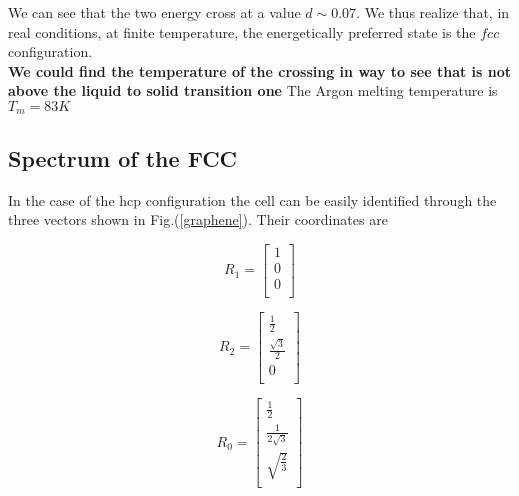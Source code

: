 \documentclass[a4paper]{article}
\begin{document}
We can see that the two energy cross at a value $d\sim 0.07$.
We thus realize that, in real conditions, at finite temperature, the energetically preferred state is the $fcc$ configuration.\\
\textbf{We could find the temperature of the crossing in way to see that is not above the liquid to solid transition one}
The Argon melting temperature is $T_m=83K$
\subsection{Spectrum of the FCC}

In the case of the hcp configuration the cell can be easily identified through the three vectors shown in Fig.(\ref{graphene}). Their coordinates are \\
\begin{minipage}{0.3\textwidth}
\centering
\begin{equation*}
R_1 =
\begin{bmatrix}
	1 \\
    0 \\
    0 \\
    
\end{bmatrix}
\end{equation*}

\end{minipage}
\begin{minipage}{0.3\textwidth}
\centering
\begin{equation*}
R_2 =
\begin{bmatrix}
    \frac{1}{2} \\
    \frac{\sqrt{3}}{2}  \\
    0 \\
\end{bmatrix}
\end{equation*}
\end{minipage}
\begin{minipage}{0.3\textwidth}
\centering
\begin{equation*}
R_0 =
\begin{bmatrix}
    \frac{1}{2} \\
    \frac{1}{2\sqrt{3}}  \\
    \sqrt{\frac{2}{3}} \\
\end{bmatrix}
\end{equation*}
\end{minipage}
\end{document}
